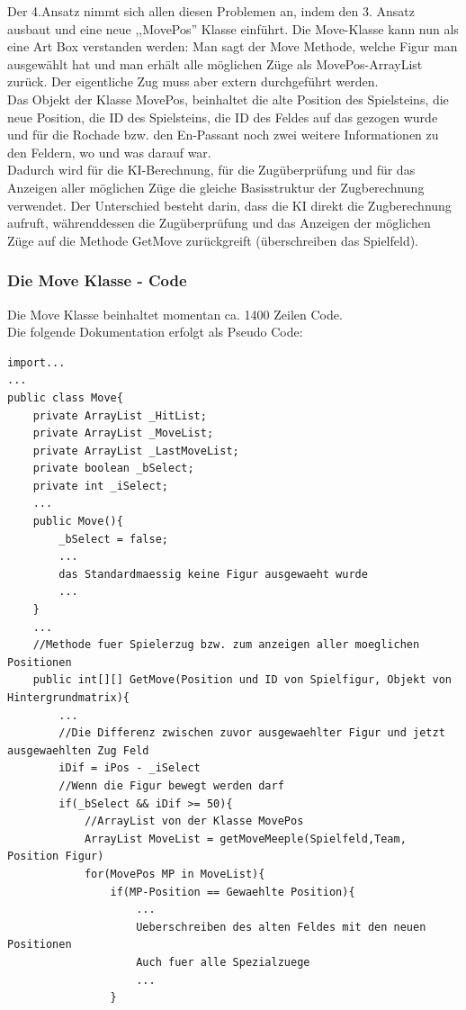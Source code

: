 \documentclass[12pt,a4paper]{article}
\begin{document}
{Der 4.Ansatz nimmt sich allen diesen Problemen an, indem den 3. Ansatz ausbaut und eine neue ,,MovePos'' Klasse einführt. Die Move-Klasse kann nun als eine Art Box verstanden werden: Man sagt der Move Methode, welche Figur man ausgewählt hat und man erhält alle möglichen Züge als MovePos-ArrayList zurück. Der eigentliche Zug muss aber extern durchgeführt werden. \\
Das Objekt der Klasse MovePos, beinhaltet die alte Position des Spielsteins, die neue Position, die ID des Spielsteins, die ID des Feldes auf das gezogen wurde und für die Rochade bzw. den En-Passant noch zwei weitere Informationen zu den Feldern, wo und was darauf war. \\
Dadurch wird für die KI-Berechnung, für die Zugüberprüfung und für das Anzeigen aller möglichen Züge die gleiche Basisstruktur der Zugberechnung verwendet. Der Unterschied besteht darin, dass die KI direkt die Zugberechnung aufruft, währenddessen die Zugüberprüfung und das Anzeigen der möglichen Züge auf die Methode GetMove zurückgreift (überschreiben das Spielfeld).\\


\subsubsection{Die Move Klasse - Code}
\label{SUBSUBSEC:MOVECODE}


Die Move Klasse beinhaltet momentan ca. 1400 Zeilen Code. \\
Die folgende Dokumentation erfolgt als Pseudo Code:

\lstset{language=Java}
\begin{lstlisting}
import...
...
public class Move{
	private ArrayList _HitList;
	private ArrayList _MoveList;
	private ArrayList _LastMoveList;
	private boolean _bSelect;
	private int _iSelect;
	...
	public Move(){
		_bSelect = false;
		...
		das Standardmaessig keine Figur ausgewaeht wurde
		...
	}			
	...
	//Methode fuer Spielerzug bzw. zum anzeigen aller moeglichen Positionen
	public int[][] GetMove(Position und ID von Spielfigur, Objekt von Hintergrundmatrix){
		...
		//Die Differenz zwischen zuvor ausgewaehlter Figur und jetzt ausgewaehlten Zug Feld		
		iDif = iPos - _iSelect
		//Wenn die Figur bewegt werden darf
		if(_bSelect && iDif >= 50){
			//ArrayList von der Klasse MovePos
			ArrayList MoveList = getMoveMeeple(Spielfeld,Team, Position Figur)
			for(MovePos MP in MoveList){
				if(MP-Position == Gewaehlte Position){
					...
					Ueberschreiben des alten Feldes mit den neuen Positionen
					Auch fuer alle Spezialzuege
					...		
				}
				

\end{lstlisting}}
\end{document}
